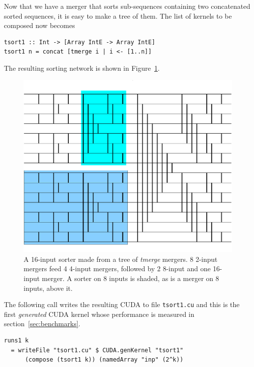 Now that we have a merger that sorts sub-sequences containing two concatenated sorted sequences, it
is easy to make a tree of them.
The list of kernels to be composed now becomes
\begin{codesize}
\begin{verbatim}
tsort1 :: Int -> [Array IntE -> Array IntE]
tsort1 n = concat [tmerge i | i <- [1..n]]
\end{verbatim}
\end{codesize}
\noindent
The resulting sorting network is shown in Figure~\ref{fig:mixedsorter}.


\begin{figure}
\centering
\includegraphics[scale=0.33]{./expressive/mmixedsorter}
\caption{A 16-input sorter made from a tree of {\em tmerge} mergers. 8 2-input mergers
feed 4 4-input mergers, followed  by 2 8-input and one 16-input merger.
A sorter on 8 inputs is shaded, as is a merger on 8 inputs, above it. 
}
\label{fig:mixedsorter}
\end{figure}
\noindent
The following call writes the resulting CUDA to file {\tt tsort1.cu}
and this is the first {\em generated} CUDA kernel whose performance is measured in section~\ref{sec:benchmarks}.

\begin{codesize}
\begin{verbatim}
runs1 k
  = writeFile "tsort1.cu" $ CUDA.genKernel "tsort1" 
      (compose (tsort1 k)) (namedArray "inp" (2^k))
\end{verbatim}
\end{codesize}

